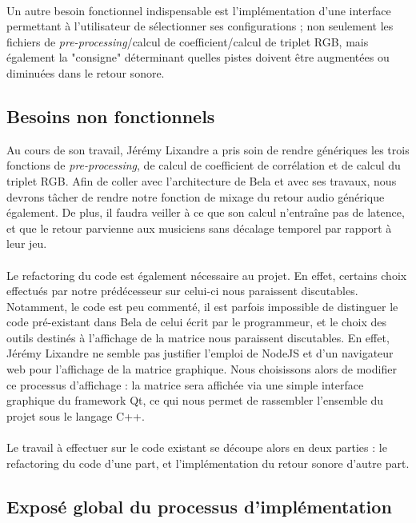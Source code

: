 \paragraph{}
Un autre besoin fonctionnel indispensable est l'implémentation d'une
interface permettant à l'utilisateur de sélectionner ses
configurations ; non seulement les fichiers de
\textit{pre-processing}/calcul de coefficient/calcul de triplet RGB,
mais également la "consigne" déterminant quelles pistes doivent être
augmentées ou diminuées dans le retour sonore.

\subsection{Besoins non fonctionnels}
Au cours de son travail, Jérémy Lixandre a pris soin de rendre
génériques les trois fonctions de \textit{pre-processing}, de calcul
de coefficient de corrélation et de calcul du triplet RGB. Afin de
coller avec l'architecture de Bela et avec ses travaux, nous devrons
tâcher de rendre notre fonction de mixage du retour audio générique
également. De plus, il faudra veiller à ce que son calcul n'entraîne
pas de latence, et que le retour parvienne aux musiciens sans décalage
temporel par rapport à leur jeu.
\paragraph{}
Le refactoring du code est également nécessaire au projet. En effet,
certains choix effectués par notre prédécesseur sur celui-ci nous
paraissent discutables. Notamment, le code est peu commenté, il est
parfois impossible de distinguer le code pré-existant dans Bela de
celui écrit par le programmeur, et le choix des outils destinés à
l'affichage de la matrice nous paraissent discutables. En effet,
Jérémy Lixandre ne semble pas justifier l'emploi de NodeJS et d'un
navigateur web pour l'affichage de la matrice graphique. Nous
choisissons alors de modifier ce processus d'affichage : la matrice
sera affichée via une simple interface graphique du framework Qt, ce
qui nous permet de rassembler l'ensemble du projet sous le langage
C++.
\paragraph{}
Le travail à effectuer sur le code existant se découpe alors en deux
parties : le refactoring du code d'une part, et l'implémentation du
retour sonore d'autre part.

\subsection{Exposé global du processus d'implémentation}
